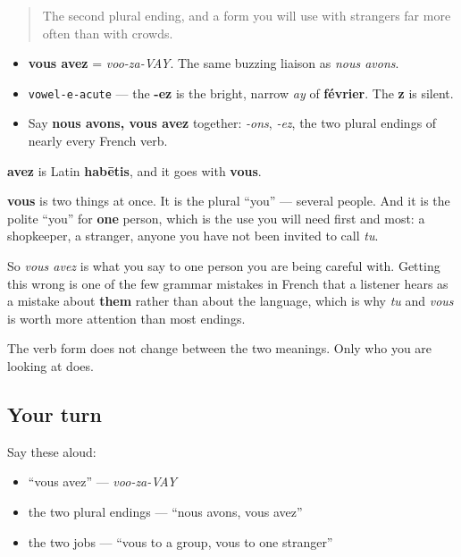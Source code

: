 \begin{quote}
The second plural ending, and a form you will use with strangers far more often than with crowds.
\end{quote}

\begin{sounds}
\begin{itemize}
\raggedright
  \item \textbf{vous avez} = \emph{voo-za-VAY}. The same buzzing liaison as \emph{nous avons}.
  \item \texttt{vowel-e-acute} — the \textbf{-ez} is the bright, narrow \emph{ay} of \textbf{février}. The \textbf{z} is silent.
  \item Say \textbf{nous avons, vous avez} together: \emph{-ons}, \emph{-ez}, the two plural endings of nearly every French verb.
\end{itemize}
\end{sounds}

\begin{cousinweb}
\textbf{avez} is Latin \textbf{habētis}, and it goes with \textbf{vous}.

\textbf{vous} is two things at once. It is the plural \textquotedblleft{}you\textquotedblright{} — several people. And it is the polite \textquotedblleft{}you\textquotedblright{} for \textbf{one} person, which is the use you will need first and most: a shopkeeper, a stranger, anyone you have not been invited to call \emph{tu}.

So \emph{vous avez} is what you say to one person you are being careful with. Getting this wrong is one of the few grammar mistakes in French that a listener hears as a mistake about \textbf{them} rather than about the language, which is why \emph{tu} and \emph{vous} is worth more attention than most endings.

The verb form does not change between the two meanings. Only who you are looking at does.
\end{cousinweb}

\subsection*{Your turn}
Say these aloud:

\begin{itemize}
\raggedright
  \item \textquotedblleft{}vous avez\textquotedblright{} — \emph{voo-za-VAY}
  \item the two plural endings — \textquotedblleft{}nous avons, vous avez\textquotedblright{}
  \item the two jobs — \textquotedblleft{}vous to a group, vous to one stranger\textquotedblright{}
\end{itemize}

